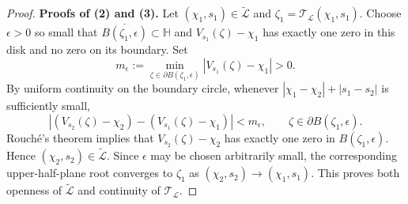 \documentclass[11pt]{amsart}
\theoremstyle{plain}
\numberwithin{equation}{section}
\numberwithin{theorem}{section}
\numberwithin{figure}{section}
\begin{document}
\begin{proof}
\bigskip
\noindent\textbf{Proofs of (2) and (3).}
Let $(\chi_1,s_1)\in\widetilde{\mathcal L}$ and
$\zeta_1=\mathcal T_{\mathcal L}(\chi_1,s_1)$. Choose $\epsilon>0$ so small
that $\overline{B(\zeta_1,\epsilon)}\subset\mathbb H$ and
$V_{s_1}(\zeta)-\chi_1$ has exactly one zero in this disk and no zero
on its boundary. Set
\[
    m_\epsilon
    :=
    \min_{\zeta\in\partial B(\zeta_1,\epsilon)}
    |V_{s_1}(\zeta)-\chi_1|
    >0.
\]
By uniform continuity on the boundary circle, whenever
$|\chi_1-\chi_2|+|s_1-s_2|$ is sufficiently small,
\[
    |(V_{s_2}(\zeta)-\chi_2)-(V_{s_1}(\zeta)-\chi_1)|
    <m_\epsilon,
    \qquad
    \zeta\in\partial B(\zeta_1,\epsilon).
\]
Rouch\'e's theorem implies that $V_{s_2}(\zeta)-\chi_2$ has exactly
one zero in $B(\zeta_1,\epsilon)$. Hence
$(\chi_2,s_2)\in\widetilde{\mathcal L}$. Since $\epsilon$ may be
chosen arbitrarily small, the corresponding upper-half-plane root
converges to $\zeta_1$ as $(\chi_2,s_2)\to(\chi_1,s_1)$. This proves
both openness of $\widetilde{\mathcal L}$ and continuity of
$\mathcal T_{\mathcal L}$.




\end{proof}
\end{document}
